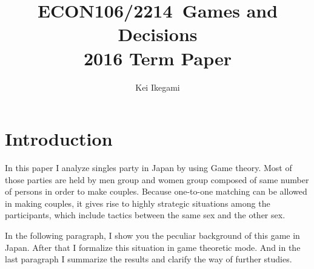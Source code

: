 \documentclass{article}
\begin{document}
\title{ECON106/2214\ Games and Decisions\\ 2016 Term Paper}
\author{Kei Ikegami}
\maketitle

\section{Introduction}
\par
In this paper I analyze singles party in Japan by using Game theory. Most of those parties are held by men group and women group composed of same number of persons in order to make couples. Because one-to-one matching can be allowed in making couples, it gives rise to highly strategic situations among the participants, which include tactics between the same sex and the other sex.
\par
In the following paragraph, I show you the peculiar background of this game in Japan. After that I formalize this situation in game theoretic mode. And in the last paragraph I summarize the results and clarify the way of further studies.
\end{document}
